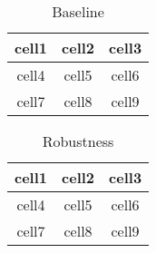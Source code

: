 \documentclass{article}
\begin{document}
\begin{table}[h]
    \centering
    \begin{tabular}{|c| c| c| }
         \hline
         cell1 & cell2 & cell3 \\ 
         \hline
         cell4 & cell5 & cell6 \\  
         \hline
         cell7 & cell8 & cell9   \\
         \hline
    \end{tabular}
    \caption{Baseline}
    \label{Baseline}
\end{table}

\begin{table}[h]
    \centering
    \begin{tabular}{|c| c| c| }
         \hline
         cell1 & cell2 & cell3 \\ 
         \hline
         cell4 & cell5 & cell6 \\  
         \hline
         cell7 & cell8 & cell9   \\
         \hline
    \end{tabular}
    \caption{Robustness}
    \label{Robustness}
\end{table}

\listoftables
\end{document}
